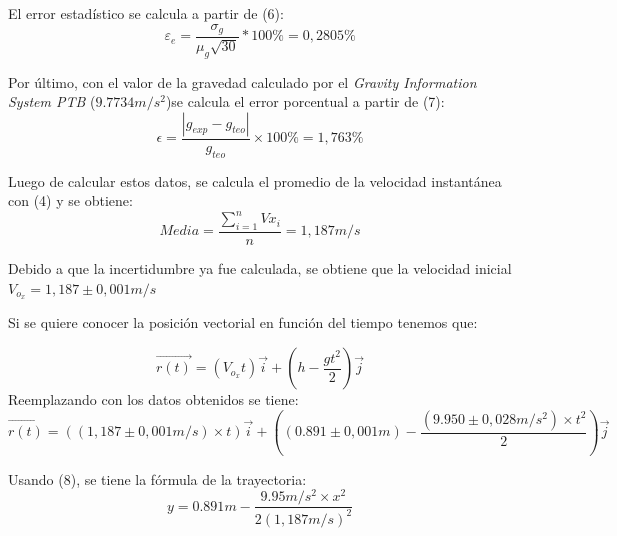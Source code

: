 \documentclass[a4paper]{article}
\begin{document}
El error estadístico se calcula a partir de (6):
\[ \varepsilon_e=\frac{\sigma_g}{\mu_g \sqrt{30}}*100\%= 0,2805\% \]

Por último, con el valor de la gravedad calculado por el \textit{Gravity Information System PTB} ($9.7734 m/s^2$)se calcula el error porcentual a partir de (7):
\[ \epsilon=\frac{|g_{exp}-g_{teo}|}{g_{teo}}\times100\% = 1,763\% \]

Luego de calcular estos datos, se calcula el promedio de la velocidad instantánea con (4) y se obtiene:
\[Media=\frac{\displaystyle\sum_{i=1}^{n} Vx_i}{n}=1,187 m/s\]

Debido a que la incertidumbre ya fue calculada, se obtiene que la velocidad inicial $V_{o_x}=1,187\pm {0,001} m/s$

Si se quiere conocer la posición vectorial en función del tiempo tenemos que:

\[\Vec{r(t)}=(V_{o_x}t)\Vec{i}+(h-\frac{gt^2}{2})\Vec{j}\]
Reemplazando con los datos obtenidos se tiene:
\[\Vec{r(t)}=((1,187\pm 0,001 m/s)\times t)\Vec{i}+((0.891 \pm 0,001 m)-\frac{(9.950 \pm 0,028 m/s^2) \times t^2}{2})\Vec{j}\]

Usando (8), se tiene la fórmula de la trayectoria:
\[y=0.891m-\frac{9.95m/s^2 \times x^2}{2(1,187m/s)^2}\]
\end{document}
